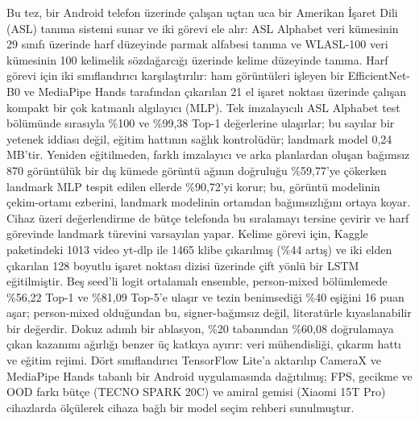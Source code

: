 \begin{ozet}
Bu tez, bir Android telefon üzerinde çalışan uçtan uca bir
Amerikan İşaret Dili (ASL) tanıma sistemi sunar ve iki görevi ele
alır: ASL Alphabet veri kümesinin 29 sınıfı üzerinde harf düzeyinde
parmak alfabesi tanıma ve WLASL-100 veri kümesinin 100 kelimelik
sözdağarcığı üzerinde kelime düzeyinde tanıma. Harf görevi için iki
sınıflandırıcı karşılaştırılır: ham görüntüleri işleyen bir
EfficientNet-B0 ve MediaPipe Hands tarafından çıkarılan 21 el işaret
noktası üzerinde çalışan kompakt bir çok katmanlı algılayıcı (MLP).
Tek imzalayıcılı ASL Alphabet test bölümünde sırasıyla \%100 ve
\%99,38 Top-1 değerlerine ulaşırlar; bu sayılar bir yetenek iddiası
değil, eğitim hattının sağlık kontrolüdür; landmark model 0,24
MB'tir. Yeniden eğitilmeden, farklı imzalayıcı ve arka planlardan
oluşan bağımsız \num{870} görüntülük bir dış kümede görüntü ağının
doğruluğu \%59,77'ye çökerken landmark MLP tespit edilen ellerde
\%90,72'yi korur; bu, görüntü modelinin çekim-ortamı ezberini,
landmark modelinin ortamdan bağımsızlığını ortaya koyar. Cihaz üzeri
değerlendirme de bütçe telefonda bu sıralamayı tersine çevirir ve harf
görevinde landmark türevini varsayılan yapar.
Kelime görevi için, Kaggle paketindeki \num{1013} video yt-dlp ile
\num{1465} klibe çıkarılmış (\%44 artış) ve iki elden çıkarılan 128
boyutlu işaret noktası dizisi üzerinde çift yönlü bir LSTM
eğitilmiştir. Beş seed'li logit ortalamalı ensemble, person-mixed
bölümlemede \%56,22 Top-1 ve \%81,09 Top-5'e ulaşır ve tezin
benimsediği \%40 eşiğini 16 puan aşar; person-mixed olduğundan bu,
signer-bağımsız değil, literatürle kıyaslanabilir bir değerdir. Dokuz
adımlı bir ablasyon, \%20 tabanından \%60,08 doğrulamaya çıkan
kazanımı ağırlığı benzer üç katkıya ayırır: veri mühendisliği, çıkarım
hattı ve eğitim rejimi. Dört sınıflandırıcı TensorFlow Lite'a
aktarılıp CameraX ve MediaPipe Hands tabanlı bir Android
uygulamasında dağıtılmış; FPS, gecikme ve OOD farkı bütçe
(TECNO SPARK 20C) ve amiral gemisi (Xiaomi 15T Pro) cihazlarda
ölçülerek cihaza bağlı bir model seçim rehberi sunulmuştur.
\end{ozet}

